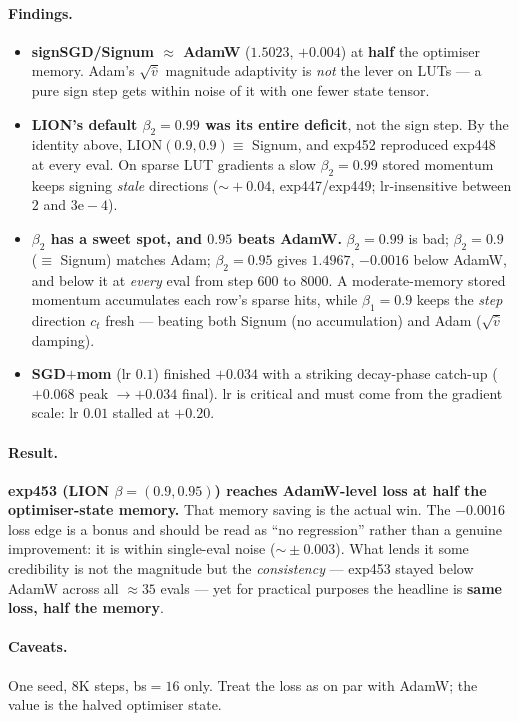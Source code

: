 \documentclass[11pt]{article}
\begin{document}
\paragraph{Findings.}
\begin{itemize}\setlength\itemsep{2pt}
\item \textbf{signSGD/Signum $\approx$ AdamW} ($1.5023$, $+0.004$) at
\textbf{half} the optimiser memory. Adam's $\sqrt{\hat v}$ magnitude
adaptivity is \emph{not} the lever on LUTs --- a pure sign step gets within
noise of it with one fewer state tensor.
\item \textbf{LION's default $\beta_2=0.99$ was its entire deficit}, not the
sign step. By the identity above, LION$(0.9,0.9)\equiv$ Signum, and exp452
reproduced exp448 at every eval. On sparse LUT gradients a slow
$\beta_2=0.99$ stored momentum keeps signing \emph{stale} directions
($\sim\!+0.04$, exp447/exp449; lr-insensitive between $2$ and
$3\mathrm{e}{-}4$).
\item \textbf{$\beta_2$ has a sweet spot, and $0.95$ beats AdamW.}
$\beta_2=0.99$ is bad; $\beta_2=0.9$ ($\equiv$ Signum) matches Adam;
$\beta_2=0.95$ gives $\mathbf{1.4967}$, $-0.0016$ below AdamW, and below it
at \emph{every} eval from step $600$ to $8000$. A moderate-memory stored
momentum accumulates each row's sparse hits, while $\beta_1=0.9$ keeps the
\emph{step} direction $c_t$ fresh --- beating both Signum (no accumulation)
and Adam ($\sqrt{\hat v}$ damping).
\item \textbf{SGD$+$mom} (lr $0.1$) finished $+0.034$ with a striking
decay-phase catch-up ($+0.068$ peak $\to +0.034$ final). lr is critical and
must come from the gradient scale: lr $0.01$ stalled at $+0.20$.
\end{itemize}

\paragraph{Result.} \textbf{exp453 (LION $\beta=(0.9,0.95)$) reaches
AdamW-level loss at half the optimiser-state memory.} That memory saving is
the actual win. The $-0.0016$ loss edge is a bonus and should be read as
``no regression'' rather than a genuine improvement: it is within
single-eval noise ($\sim\!\pm 0.003$). What lends it some credibility is
not the magnitude but the \emph{consistency} --- exp453 stayed below AdamW
across all $\approx 35$ evals --- yet for practical purposes the headline is
\textbf{same loss, half the memory}.

\paragraph{Caveats.} One seed, $8$K steps, bs$=16$ only. Treat the loss as
on par with AdamW; the value is the halved optimiser state.
\end{document}
